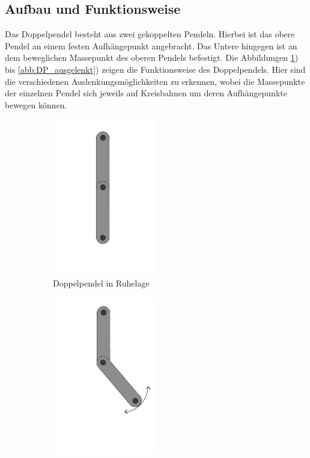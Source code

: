 \documentclass[11pt,a4paper,titlepage, ngerman]{article}
\begin{document}
		\subsection{Aufbau und Funktionsweise}	
			
			Das Doppelpendel besteht aus zwei gekoppelten Pendeln. Hierbei ist das obere Pendel an einem festen Aufhängepunkt angebracht. Das Untere  hingegen ist an dem beweglichen Massepunkt des oberen Pendels befestigt. Die Abbildungen \ref{abb:DP_Ruhe}) bis \ref{abb:DP_ausgelenkt}) zeigen die Funktionsweise des Doppelpendels. Hier sind die verschiedenen Auslenkungsmöglichkeiten zu erkennen, wobei die Massepunkte der einzelnen Pendel sich jeweils auf Kreisbahnen um deren Aufhängepunkte bewegen können.	
			\begin{figure}[ht]
				\begin{subfigure}{0.5\textwidth}
					\centering
					\includegraphics[width=0.5\textwidth]{Doppelpendel_Ruhelage.png}
					\caption{Doppelpendel in Ruhelage}
					\label{abb:DP_Ruhe}	
				\end{subfigure}
				\begin{subfigure}{0.5\textwidth}
					\centering
					\includegraphics[width=0.5\textwidth]{Doppelpendel_Auslenkung_P2.png}

\end{subfigure}
\end{figure}
\end{document}
